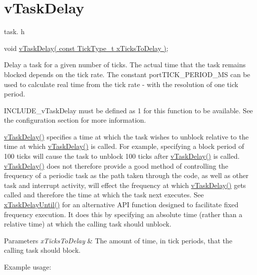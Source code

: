 \hypertarget{group__v_task_delay}{}\section{v\+Task\+Delay}
\label{group__v_task_delay}
task. h 
\begin{DoxyPre}
void \hyperlink{externals_2freertos_2include_2task_8h_aa154068cecd7f31446a7a84af44ab1a3}{vTaskDelay( const TickType\_t xTicksToDelay )};
\end{DoxyPre}


Delay a task for a given number of ticks. The actual time that the task remains blocked depends on the tick rate. The constant port\+T\+I\+C\+K\+\_\+\+P\+E\+R\+I\+O\+D\+\_\+\+MS can be used to calculate real time from the tick rate -\/ with the resolution of one tick period.

I\+N\+C\+L\+U\+D\+E\+\_\+v\+Task\+Delay must be defined as 1 for this function to be available. See the configuration section for more information.

\hyperlink{externals_2freertos_2include_2task_8h_aa154068cecd7f31446a7a84af44ab1a3}{v\+Task\+Delay()} specifies a time at which the task wishes to unblock relative to the time at which \hyperlink{externals_2freertos_2include_2task_8h_aa154068cecd7f31446a7a84af44ab1a3}{v\+Task\+Delay()} is called. For example, specifying a block period of 100 ticks will cause the task to unblock 100 ticks after \hyperlink{externals_2freertos_2include_2task_8h_aa154068cecd7f31446a7a84af44ab1a3}{v\+Task\+Delay()} is called. \hyperlink{externals_2freertos_2include_2task_8h_aa154068cecd7f31446a7a84af44ab1a3}{v\+Task\+Delay()} does not therefore provide a good method of controlling the frequency of a periodic task as the path taken through the code, as well as other task and interrupt activity, will effect the frequency at which \hyperlink{externals_2freertos_2include_2task_8h_aa154068cecd7f31446a7a84af44ab1a3}{v\+Task\+Delay()} gets called and therefore the time at which the task next executes. See \hyperlink{externals_2freertos_2include_2task_8h_af7ba46e730bec507c8a20d9f9b9c0e1d}{x\+Task\+Delay\+Until()} for an alternative A\+PI function designed to facilitate fixed frequency execution. It does this by specifying an absolute time (rather than a relative time) at which the calling task should unblock.


\begin{DoxyParams}{Parameters}
{\em x\+Ticks\+To\+Delay} & The amount of time, in tick periods, that the calling task should block.\\
\hline
\end{DoxyParams}
Example usage\+:

